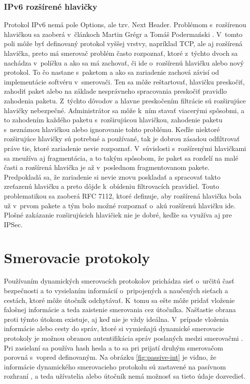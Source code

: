 \subsubsection*{IPv6 rozšírené hlavičky}
Protokol IPv6 nemá pole Options, ale tzv. Next Header. Problémom s~rozšírenou hlavičkou sa zaoberá v~článkoch Martin Grégr a Tomáš Podermański \cite{Gregr2622015} \cite{Podermanski1922015}. V~tomto poli môže byť definovaný protokol vyššej vrstvy, napríklad TCP, ale aj rozšírená hlavička, preto má smerovač problém často rozpoznať, ktoré z~týchto dvoch sa nachádza v~políčku a ako sa má zachovať, či ide o~rozšírenú hlavičku alebo nový protokol. To čo nastane s~paketom a ako sa zariadenie zachová závisí od implementácie softvéru v~smerovači. Ten sa môže reštartovať, hlavičku preskočiť, zahodiť paket alebo na základe nesprávneho spracovania preskočiť pravidlo zahodenia paketu. Z~týchto dôvodov a hlavne preskočením filtrácie sú rozširujúce hlavičky nebezpečné. Administrátor sa môže k~ním stavať viacerými spôsobmi, a to zahodením každého paketu s~rozširujúcou hlavičkou, zahodenie paketu s~neznámou hlavičkou alebo ignorovanie tohto problému. Keďže niektoré rozširujúce hlavičky sú potrebné a používané, tak je dobrou zásadou odfiltrovať práve tie, ktoré zariadenie nevie rozpoznať. V~súvislosti s~rozšírenými hlavičkami sa zneužíva aj fragmentácia, a to takým spôsobom, že paket sa rozdelí na malé časti a rozšírená hlavička je až v~poslednom fragmentovanom pakete. Predpokladá sa, že zariadenie si nevie znovu poskladať a spracovať takto zreťazenú hlavičku a preto dôjde k~obídeniu filtrovacích pravidiel. Touto problematikou sa zaoberá RFC 7112, ktoré definuje, aby rozšírená hlavička bola už v~prvom pakete a tým bolo možné rozpoznať o~akú rozšírenú hlavičku ide. Plošné zakázanie rozširujúcich hlavičiek nie je dobré, keďže sa využíva aj pre IPSec.

\section*{Smerovacie protokoly}
Používaním dynamických smerovacích protokolov prichádza sieť o~určitú časť bezpečnosti a to vysielaním informácií o~pripojených a naučených sieťach a cestách, ktoré môže útočník odchytávať. K~tomu sa ešte môže pridať vloženie falošnej informácie a teda zaistenie smerovania cez útočníka. Našťastie obrana proti týmto útokom existuje, aj keď nie je vždy ideálna. V~prípade vloženia informácie alebo cesty do správ, ktoré si vymieňajú dynamické smerovacie protokoly je možnou obranou autentifikácia správ poslaných medzi smerovačmi \cite{McMillan2018} \cite{Singh2018} \cite{CIS_DrTLsgXv24lxeIIM}. Pri zasielaní sa používa hash hesla a to sa pri prijatí druhým smerovačom porovná s~vopred definovaným. Na obrázku \ref{fig:passive-int} je vidno, že informácie dynamického smerovacieho protokolu sú zastavené na pasívnom rozhraní \cite{Khandelwal2016}, a teda užívatelia alebo útočník nemá možnosť sa tieto údaje dozvedieť.

